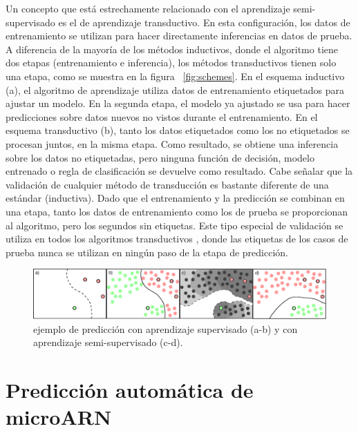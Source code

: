 Un concepto que está estrechamente relacionado con el aprendizaje semi-supervisado es el de aprendizaje transductivo. En esta configuración, los datos de
entrenamiento se utilizan para hacer directamente inferencias en datos de prueba. A diferencia de la mayoría de los métodos inductivos, donde el algoritmo
tiene dos etapas (entrenamiento e inferencia), los métodos transductivos tienen solo una etapa, como se muestra en la figura ~\ref{fig:schemes}. En el esquema
inductivo (a), el algoritmo de aprendizaje utiliza datos de entrenamiento etiquetados para ajustar un modelo. En la segunda etapa, el modelo ya ajustado se usa
para hacer predicciones sobre datos nuevos no vistos durante el entrenamiento. En el esquema transductivo (b), tanto los datos etiquetados como los no
etiquetados se procesan juntos, en la misma etapa. Como resultado, se obtiene una inferencia sobre los datos no etiquetadas, pero ninguna función de
decisión, modelo entrenado o regla de clasificación se devuelve como resultado. Cabe señalar que la validación de cualquier método de transducción es
bastante diferente de una estándar (inductiva). Dado que el entrenamiento y la predicción se combinan en una etapa, tanto los datos de entrenamiento como los
de prueba se proporcionan al algoritmo, pero los segundos sin etiquetas. Este tipo especial de validación se utiliza en todos los algoritmos transductivos
\citep{chapelle2006semi}, donde las etiquetas de los casos de prueba nunca se utilizan en ningún paso de la etapa de predicción.

\begin{figure}[tpb]
	\centering
	\includegraphics[width=\linewidth]{fig/semivssuperv.eps}
	\caption[Aprendizaje semi-supervisado vs supervisado]{ejemplo de predicción con aprendizaje supervisado (a-b) y con aprendizaje semi-supervisado (c-d).}
	\label{fig:semivssuperv}
\end{figure}

\section{Predicción automática de microARN}

